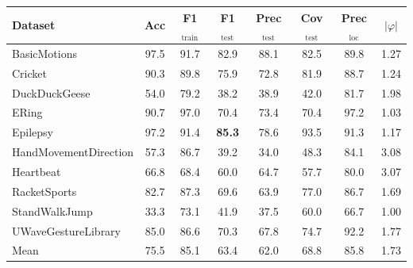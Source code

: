 \begin{tabular}{lccccccc}
\toprule
Dataset & Acc & F1$_{\text{train}}$ & F1$_{\text{test}}$ & Prec$_{\text{test}}$ & Cov$_{\text{test}}$ & Prec$_{\text{loc}}$ & $|\varphi|$ \\
\midrule
BasicMotions & 97.5 & 91.7 & 82.9 & 88.1 & 82.5 & 89.8 & 1.27 \\
Cricket & 90.3 & 89.8 & 75.9 & 72.8 & 81.9 & 88.7 & 1.24 \\
DuckDuckGeese & 54.0 & 79.2 & 38.2 & 38.9 & 42.0 & 81.7 & 1.98 \\
ERing & 90.7 & 97.0 & 70.4 & 73.4 & 70.4 & 97.2 & 1.03 \\
Epilepsy & 97.2 & 91.4 & \textbf{85.3} & 78.6 & 93.5 & 91.3 & 1.17 \\
HandMovementDirection & 57.3 & 86.7 & 39.2 & 34.0 & 48.3 & 84.1 & 3.08 \\
Heartbeat & 66.8 & 68.4 & 60.0 & 64.7 & 57.7 & 80.0 & 3.07 \\
RacketSports & 82.7 & 87.3 & 69.6 & 63.9 & 77.0 & 86.7 & 1.69 \\
StandWalkJump & 33.3 & 73.1 & 41.9 & 37.5 & 60.0 & 66.7 & 1.00 \\
UWaveGestureLibrary & 85.0 & 86.6 & 70.3 & 67.8 & 74.7 & 92.2 & 1.77 \\
\midrule
Mean & 75.5 & 85.1 & 63.4 & 62.0 & 68.8 & 85.8 & 1.73 \\
\bottomrule
\end{tabular}
